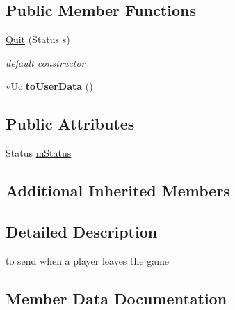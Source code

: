 \subsection*{Public Member Functions}
\begin{DoxyCompactItemize}
\item 
\mbox{\label{class_network_1_1_messages_1_1_quit_afe4690eb2ae3bf3020979e7789d9cb6a}} 
\hyperlink{class_network_1_1_messages_1_1_quit_afe4690eb2ae3bf3020979e7789d9cb6a}{Quit} (Status s)
\begin{DoxyCompactList}\small\item\em default constructor \end{DoxyCompactList}\item 
\mbox{\label{class_network_1_1_messages_1_1_quit_ae8fd025870346e48f8ae4e3f384880a3}} 
v\+Uc {\bfseries to\+User\+Data} ()
\end{DoxyCompactItemize}
\subsection*{Public Attributes}
\begin{DoxyCompactItemize}
\item 
Status \hyperlink{class_network_1_1_messages_1_1_quit_aa46df79474c51abd0eecffbfa0924ae2}{m\+Status}
\end{DoxyCompactItemize}
\subsection*{Additional Inherited Members}


\subsection{Detailed Description}
to send when a player leaves the game 

\subsection{Member Data Documentation}
\mbox{\label{class_network_1_1_messages_1_1_quit_aa46df79474c51abd0eecffbfa0924ae2}} 
